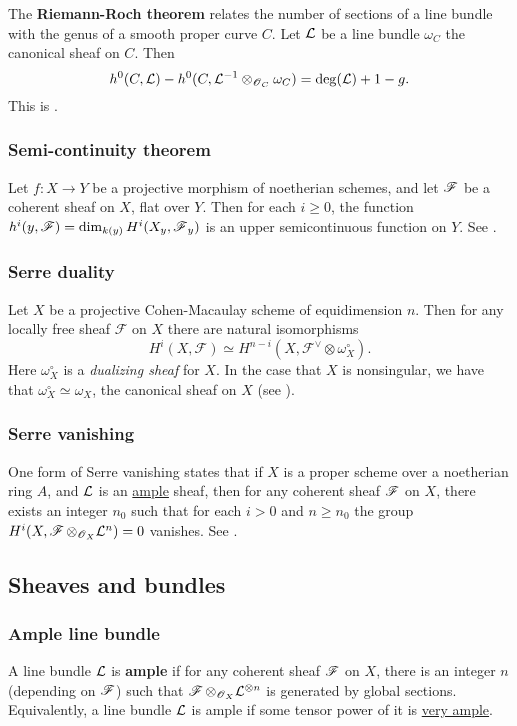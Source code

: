 \documentclass[11pt, english]{article}
\begin{document}
The \textbf{Riemann-Roch theorem} relates the number of sections of a line bundle with the genus of a smooth proper curve $C$. Let $\mathcal{L}$ be a line bundle $\omega_C$ the canonical sheaf on $C$. Then
\[
h^0(C,\mathcal{L}) - h^0(C, \mathcal{L}^{-1} \otimes_{\operatorname{\mathscr{O}}_{C}} \omega_C) = \deg(\mathcal{L}) +1 -g.
\]
This is \cite[Theorem IV.1.3]{hartshorne}.

\subsubsection{Semi-continuity theorem}
\label{semicontinuity}

Let $f:X \to Y$ be a projective morphism of noetherian schemes, and let $\operatorname{\mathscr{F}}$ be a coherent sheaf on $X$, flat over $Y$. Then for each $i \geq 0$, the function $h^i(y,\operatorname{\mathscr{F}})=\dim_{k(y)} H^i(X_y,\operatorname{\mathscr{F}}_y)$ is an upper semicontinuous function on $Y$. See \cite[Chapter III, Theorem 12.8]{hartshorne}.

\subsubsection{Serre duality}
\label{serreduality}

Let $X$ be a projective Cohen-Macaulay scheme of equidimension $n$. Then for any locally free sheaf $\mathcal F$ on $X$ there are natural isomorphisms
\[
H^i(X,\mathcal F) \simeq H^{n-i}(X, \mathcal F^\vee \otimes \omega_X^\circ).
\]
Here $\omega_X^\circ$ is a \emph{dualizing sheaf} for $X$. In the case that $X$ is nonsingular, we have that $\omega_X^\circ \simeq \omega_X$, the canonical sheaf on $X$ (see \cite[Chapter III, Corollary 7.12]{hartshorne}). 

\subsubsection{Serre vanishing}
\label{serrevanishing}

One form of Serre vanishing states that if $X$ is a proper scheme over a noetherian ring $A$, and $\mathcal{L}$ is an \hyperref[amplelinebundle]{ample} sheaf, then for any coherent sheaf $\operatorname{\mathscr{F}}$ on $X$, there exists an integer $n_0$ such that for each $i > 0$ and $n \geq n_0$ the group $H^i(X, \operatorname{\mathscr{F}} \otimes_{\operatorname{\mathscr{O}}_X} \mathcal{L}^n)=0$ vanishes. See \cite[Proposition III.5.3]{hartshorne}.

\subsection{Sheaves and bundles}
\subsubsection{Ample line bundle}
\label{amplelinebundle}
A line bundle $\mathcal{L}$ is \textbf{ample} if for any coherent sheaf $\operatorname{\mathscr{F}}$ on $X$, there is an integer $n$ (depending on $\operatorname{\mathscr{F}}$) such that $\operatorname{\mathscr{F}} \otimes_{\operatorname{\mathscr{O}}_X} \mathcal{L}^{\otimes n}$ is generated by global sections. Equivalently, a line bundle $\mathcal{L}$ is ample if some tensor power of it is \hyperref[veryample]{very ample}.
\end{document}
